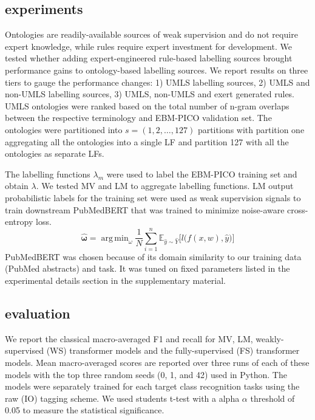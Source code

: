 \documentclass[10.7pt,]{article}
\DeclareMathOperator*{\argmin}{arg\,min}
\begin{document}
\subsection{experiments}\label{subsec:experiments}
%
Ontologies are readily-available sources of weak supervision and do not require expert knowledge, while rules require expert investment for development.
We tested whether adding expert-engineered rule-based labelling sources brought performance gains to ontology-based labelling sources.
We report results on three tiers to gauge the performance changes: 1) UMLS labelling sources, 2) UMLS and non-UMLS labelling sources, 3) UMLS, non-UMLS and exert generated rules. 
UMLS ontologies were ranked based on the total number of n-gram overlaps between the respective terminology and EBM-PICO validation set.
The ontologies were partitioned into $s = ( 1, 2, \dotso , 127 )$ partitions with partition one aggregating all the ontologies into a single LF and partition 127 with all the ontologies as separate LFs.



The labelling functions $\lambda_{m}$ were used to label the EBM-PICO training set and obtain $\lambda$. 
We tested MV and LM to aggregate labelling functions.
LM output probabilistic labels for the training set were used as weak supervision signals to train downstream PubMedBERT that was trained to minimize noise-aware cross-entropy loss.
%
\begin{equation}
\bm{\hat{\omega}} = \argmin_{\omega} \frac{1}{N} \sum_{i=1}^{n} \mathbb{ E }_{ \hat{y} \sim \hat{Y}} \big[ l \big( f(x, w), \hat{y} \big) \big]
\end{equation}
%
PubMedBERT was chosen because of its domain similarity to our training data (PubMed abstracts) and task.
It was tuned on fixed parameters listed in the experimental details section in the supplementary material. 
%
%
%
\subsection{evaluation}\label{eval}
%
We report the classical macro-averaged F1 and recall for MV, LM, weakly-supervised (WS) transformer models and the fully-supervised (FS) transformer models.
Mean macro-averaged scores are reported over three runs of each of these models with the top three random seeds (0, 1, and 42) used in Python.
The models were separately trained for each target class recognition tasks using the raw (IO) tagging scheme.
We used students t-test with a alpha $\alpha$ threshold of 0.05 to measure the statistical significance.
%
\end{document}
